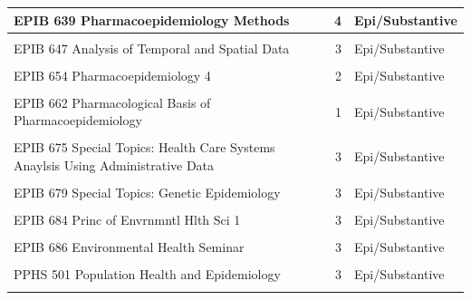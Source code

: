 \documentclass[
  openany]{book}
\begin{document}
\begin{table}
{\begin{tabular}[t]{l|r|l}
\hline
EPIB 639 Pharmacoepidemiology Methods & 4 & Epi/Substantive\\
\hline
\cellcolor{gray!6}{EPIB 645 Confounding Control in Pharmacoepidemiology} & \cellcolor{gray!6}{1} & \cellcolor{gray!6}{Epi/Substantive}\\
\hline
EPIB 647 Analysis of Temporal and Spatial Data & 3 & Epi/Substantive\\
\hline
\cellcolor{gray!6}{EPIB 648 Methods in Social Epidemiology} & \cellcolor{gray!6}{3} & \cellcolor{gray!6}{Epi/Substantive}\\
\hline
EPIB 654 Pharmacoepidemiology 4 & 2 & Epi/Substantive\\
\hline
\cellcolor{gray!6}{EPIB 661 Pharmacoepidemiology 3} & \cellcolor{gray!6}{2} & \cellcolor{gray!6}{Epi/Substantive}\\
\hline
EPIB 662 Pharmacological Basis of Pharmacoepidemiology & 1 & Epi/Substantive\\
\hline
\cellcolor{gray!6}{EPIB 671 Cancer Epidemiology\&Prevention} & \cellcolor{gray!6}{2} & \cellcolor{gray!6}{Epi/Substantive}\\
\hline
EPIB 675 Special Topics: Health Care Systems Anaylsis Using Administrative Data & 3 & Epi/Substantive\\
\hline
\cellcolor{gray!6}{EPIB 676 Special Topics: Bayesian Analysis in the Health Sciences} & \cellcolor{gray!6}{3} & \cellcolor{gray!6}{Biostatistics}\\
\hline
EPIB 679 Special Topics: Genetic Epidemiology & 3 & Epi/Substantive\\
\hline
\cellcolor{gray!6}{EPIB 681 Global Health: Epid. Research} & \cellcolor{gray!6}{3} & \cellcolor{gray!6}{Epi/Substantive}\\
\hline
EPIB 684 Princ of Envrnmntl Hlth Sci 1 & 3 & Epi/Substantive\\
\hline
\cellcolor{gray!6}{EPIB 685 Princ of Envrnmntl Hlth Sci 2} & \cellcolor{gray!6}{3} & \cellcolor{gray!6}{Epi/Substantive}\\
\hline
EPIB 686 Environmental Health Seminar & 3 & Epi/Substantive\\
\hline
\cellcolor{gray!6}{EPIB 710 Advanced Causal Inference} & \cellcolor{gray!6}{3} & \cellcolor{gray!6}{Biostatistics}\\
\hline
PPHS 501 Population Health and Epidemiology & 3 & Epi/Substantive\\
\hline
\cellcolor{gray!6}{PPHS 511 Fundamentals of Global Health} & \cellcolor{gray!6}{3} & \cellcolor{gray!6}{Epi/Substantive}\\

\end{tabular}}
\end{table}
\end{document}
